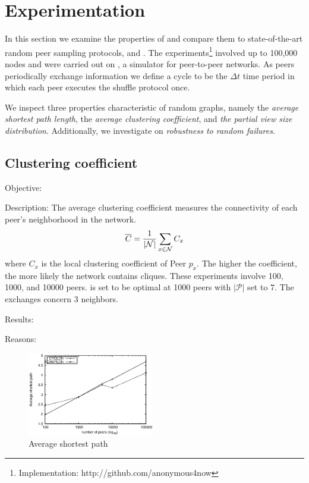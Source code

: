 
\section{Experimentation}
\label{sec:experiments}
In this section we examine the properties of \SCAMPLON{} and 
compare them to state-of-the-art random peer sampling protocols, \SCAMP{} and \CYCLON{}. 
The experiments\footnote{Implementation: http://github.com/anonymous4now}
involved up to 100,000 nodes and were carried out on \PEERSIM{} \cite{peersim}, 
a simulator for peer-to-peer networks.
As peers periodically exchange information we define a cycle to be 
the $\Delta t$ time period in which each peer executes the shuffle protocol once.

We inspect three properties characteristic of random graphs, namely the
\emph{average shortest path length}, the \emph{average clustering coefficient},
and \emph{the partial view size distribution}. Additionally, we investigate on
\emph{robustness to random failures}.

\subsection{Clustering coefficient}
\begin{asparadesc}
\item[Objective:]
\item[Description:] The average clustering coefficient measures the
  connectivity of each peer's neighborhood in the network.
  \begin{equation}
    \overline{C} = {1\over |\mathcal{N}|}\sum\limits_{x\in\mathcal{N}}C_x
    \end{equation}
    where $C_x$ is the local clustering coefficient of Peer $p_x$. The higher
    the coefficient, the more likely the network contains cliques. These
    experiments involve 100, 1000, and 10000 peers. \CYCLON{} is set to be optimal
    at 1000 peers with $|\mathcal{P}|$ set to $7$. The exchanges concern $3$
    neighbors.
\item[Results:]
\item[Reasons:]
\end{asparadesc}

\begin{figure}
    \centering
    \includegraphics[width=0.49\textwidth]{img/avgpath.eps}
    \caption{Average shortest path}
    \label{fig:avgpath}
\end{figure}

